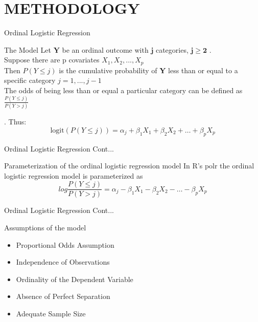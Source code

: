 \documentclass{beamer}
\numberwithin{equation}{section}
\numberwithin{table}{section}
\begin{document}
\section{METHODOLOGY}
\begin{frame}{Ordinal Logistic Regression}
\begin{block}{The Model}
	Let $\mathbf{Y}$ be an ordinal outcome with $\mathbf{j}$ categories, $\mathbf{j \ge 2} $ . \\
	Suppose there are p covariates $X_1,X_2,...,X_p$\\
	Then \textbf{$P(Y\le j)$} is the cumulative probability of \textbf{Y} less than or equal to a specific category ${j=1,...,j-1}$\\
	The odds of being less than or equal a particular category can be defined as 	$\frac{P(Y\le j)}{P(Y> j)}$
\end{block}
\begin{block}{.}
Thus:
	\begin{equation}
		\text{logit}(P(Y \leq j)) = \alpha_j + \beta_1 X_1 + \beta_2 X_2 + \ldots + \beta_p X_p
		\label{eq:3.1}
	\end{equation}
\end{block}
\end{frame}
\begin{frame}{Ordinal Logistic Regression Cont...}

\begin{block}{Parameterization of the ordinal logistic regression model}
In R’s polr the ordinal logistic regression model is parameterized as
		\begin{equation}	
			log \frac{P(Y\le j)}{P(Y>j)} = \alpha_j - \beta_1 X_1 - \beta_2 X_2 - \ldots - \beta_p X_p
			\label{eq:3.2}
		\end{equation}
\end{block}
\end{frame}
\begin{frame}{Ordinal Logistic Regression Cont...}
	\begin{block}{Assumptions of the model}
\begin{itemize}
	\item Proportional Odds Assumption
	\item Independence of Observations
	\item Ordinality of the Dependent Variable
	\item Absence of Perfect Separation
	\item Adequate Sample Size
\end{itemize}
	\end{block}
\end{frame}
\end{document}
